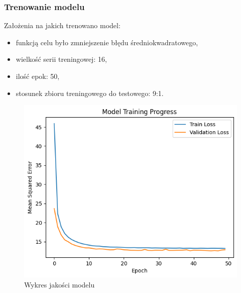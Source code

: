 \documentclass[usepdftitle=false,24pt]{beamer}
\begin{document}
\begin{frame}
    \frametitle{Trenowanie modelu}

    Założenia na jakich trenowano model:
    \begin{itemize}
        \item funkcją celu było zmniejszenie błędu średniokwadratowego,
        \item wielkość serii treningowej: 16,
        \item ilość epok: 50,
        \item stosunek zbioru treningowego do testowego: 9:1.
    \end{itemize}


    \begin{figure}
        \includegraphics[width=.6\textwidth]{images/TestVsValidation.png}
        \caption{Wykres jakości modelu}
    \end{figure}

\end{frame}
\end{document}
